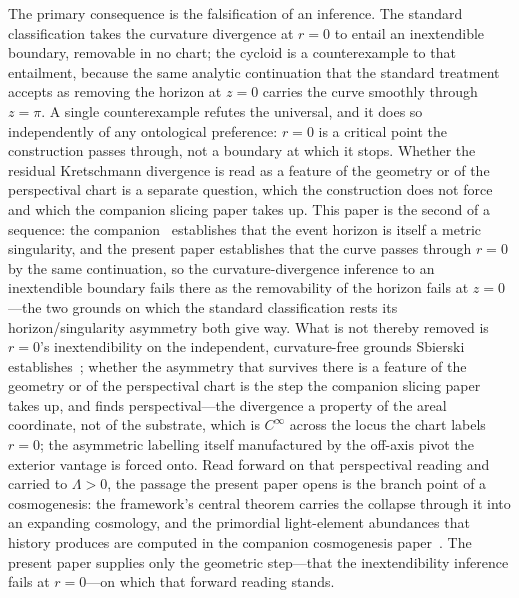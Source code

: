 \documentclass[11pt,a4paper]{article}
\theoremstyle{definition}
\begin{document}
The primary consequence is the falsification of an inference. The standard classification takes the curvature divergence at $r=0$ to entail an inextendible boundary, removable in no chart; the cycloid is a counterexample to that entailment, because the same analytic continuation that the standard treatment accepts as removing the horizon at $z=0$ carries the curve smoothly through $z=\pi$. A single counterexample refutes the universal, and it does so independently of any ontological preference: $r=0$ is a critical point the construction passes through, not a boundary at which it stops. Whether the residual Kretschmann divergence is read as a feature of the geometry or of the perspectival chart is a separate question, which the construction does not force and which the companion slicing paper takes up. This paper is the second of a sequence: the companion~\cite{JanzenBHcausality} establishes that the event horizon is itself a metric singularity, and the present paper establishes that the curve passes through $r=0$ by the same continuation, so the curvature-divergence inference to an inextendible boundary fails there as the removability of the horizon fails at $z=0$---the two grounds on which the standard classification rests its horizon/singularity asymmetry both give way. What is not thereby removed is $r=0$'s inextendibility on the independent, curvature-free grounds Sbierski establishes~\cite{sbierski2018}; whether the asymmetry that survives there is a feature of the geometry or of the perspectival chart is the step the companion slicing paper~\cite{JanzenSlicing} takes up, and finds perspectival---the divergence a property of the areal coordinate, not of the substrate, which is $C^{\infty}$ across the locus the chart labels $r=0$; the asymmetric labelling itself manufactured by the off-axis pivot the exterior vantage is forced onto. Read forward on that perspectival reading and carried to $\Lambda>0$, the passage the present paper opens is the branch point of a cosmogenesis: the framework's central theorem carries the collapse through it into an expanding cosmology, and the primordial light-element abundances that history produces are computed in the companion cosmogenesis paper~\cite{JanzenCosmogenesis}. The present paper supplies only the geometric step---that the inextendibility inference fails at $r=0$---on which that forward reading stands.
\end{document}
